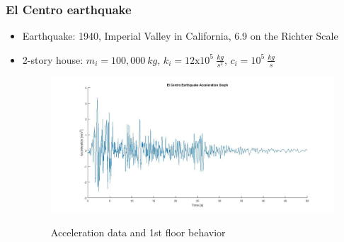 \documentclass[xcolor=svgnames,9pt]{beamer}
\theoremstyle{remark}
\begin{document}
		\begin{frame}
  			\frametitle{El Centro earthquake}
			\begin{itemize}
				\item  Earthquake: 1940, Imperial Valley in California, 6.9 on the Richter Scale
				\item 2-story house: $m_i = 100,000\  kg$, $k_i = 12\text{x}10^5\  \frac{kg}{s^2}$, $c_i = 10^5\ \frac{kg}{s}$
				\begin{figure}[h!]
   					\centering
   					\includegraphics[width=120mm]{pictures/ElCentro.jpg}
				           \label{fig10}
					\caption{Acceleration data and 1st floor behavior}
  				\end{figure}
			\end{itemize}
		\end{frame}
\end{document}
